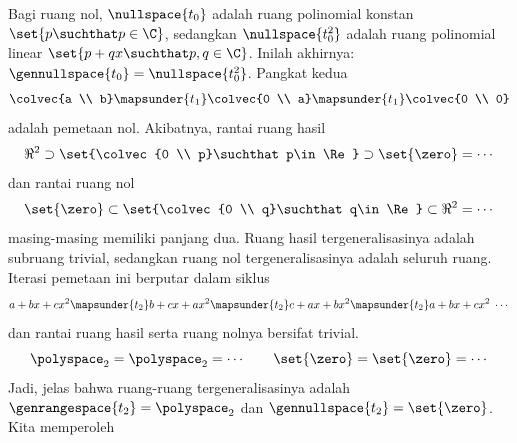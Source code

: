 \begin{exercises}
\begin{answer}
\begin{exparts}
           Bagi ruang nol, $\nullspace{t_0}$ adalah ruang polinomial konstan
           $\set{p\suchthat p\in \C}$, sedangkan $\nullspace{t_0^2}$ adalah
           ruang polinomial linear $\set{p+qx\suchthat p,q\in \C}$.
           Inilah akhirnya: $\gennullspace{t_0}=\nullspace{t_0^2}$.
         \partsitem Pangkat kedua
           \begin{equation*}
             \colvec{a \\ b}
              \mapsunder{t_1}\colvec{0 \\ a}
              \mapsunder{t_1}\colvec{0 \\ 0}
           \end{equation*}
           adalah pemetaan nol.
           Akibatnya, rantai ruang hasil
           \begin{equation*}
             \Re^2
               \supset\set{\colvec{0 \\ p}\suchthat p\in\Re}
               \supset\set{\zero}
               =\cdots
           \end{equation*}
           dan rantai ruang nol
           \begin{equation*}
             \set{\zero}
               \subset\set{\colvec{0 \\ q}\suchthat q\in\Re}
               \subset\Re^2
               =\cdots
           \end{equation*}
           masing-masing memiliki panjang dua.
           Ruang hasil tergeneralisasinya adalah subruang trivial, sedangkan
           ruang nol tergeneralisasinya adalah seluruh ruang.
         \partsitem Iterasi pemetaan ini berputar dalam siklus
           \begin{equation*}
             a+bx+cx^2
               \mapsunder{t_2} b+cx+ax^2            
               \mapsunder{t_2} c+ax+bx^2            
               \mapsunder{t_2} a+bx+cx^2
               \;\cdots            
           \end{equation*}
           dan rantai ruang hasil serta ruang nolnya bersifat trivial.
           \begin{equation*}
             \polyspace_2=\polyspace_2=\cdots
              \qquad
              \set{\zero}=\set{\zero}=\cdots  
           \end{equation*}
           Jadi, jelas bahwa ruang-ruang tergeneralisasinya adalah
           $\genrangespace{t_2}=\polyspace_2$ dan
           $\gennullspace{t_2}=\set{\zero}$.
         \partsitem Kita memperoleh
           \begin{equation*}

\end{equation*}
\end{exparts}
\end{answer}
\end{exercises}
